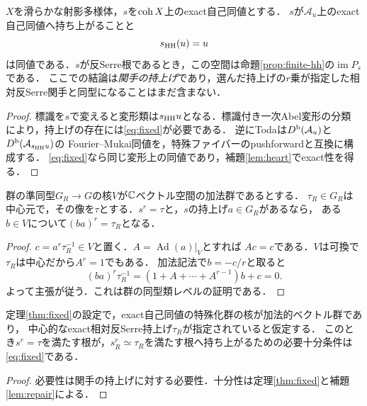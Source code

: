 \begin{theorem}[指定した関手の一次持上げ]\label{thm:fixed}
$X$を滑らかな射影多様体，$s$を$\operatorname{coh} X$上のexact自己同値とする．
$s$が$\mathcal A_u$上のexact自己同値へ持ち上がることと
\begin{equation}\label{eq:fixed}
 s_{\operatorname{HH}}(u)=u
\end{equation}
は同値である．$s$が反Serre根であるとき，この空間は命題\ref{prop:finite-hh}の$\operatorname{im}P_s$である．
ここでの結論は\emph{関手の持上げ}であり，選んだ持上げの$r$乗が指定した相対反Serre関手と同型になることはまだ含まない．
\end{theorem}
\begin{proof}
標識を$s$で変えると変形類は$s_{\operatorname{HH}}u$となる．標識付き一次Abel変形の分類
\cite[\S3]{LVdB}により，持上げの存在には\eqref{eq:fixed}が必要である．
逆にToda\cite[Theorem 1.1]{Toda}は$D^{\mathrm b}(\mathcal A_u)$と$D^{\mathrm b}(\mathcal A_{s_{\operatorname{HH}}u})$の
Fourier--Mukai同値を，特殊ファイバーのpushforwardと互換に構成する．
\eqref{eq:fixed}なら同じ変形上の同値であり，補題\ref{lem:heart}でexact性を得る．
\end{proof}

\begin{lemma}\label{lem:repair}
群の準同型$G_R\to G$の核$V$が$\mathbb C$ベクトル空間の加法群であるとする．
$\tau_R\in G_R$は中心元で，その像を$\tau$とする．$s^r=\tau$と，$s$の持上げ$a\in G_R$があるなら，
ある$b\in V$について$(ba)^r=\tau_R$となる．
\end{lemma}
\begin{proof}
$c=a^r\tau_R^{-1}\in V$と置く．$A=\operatorname{Ad}(a)|_V$とすれば
$Ac=c$である．$V$は可換で$\tau_R$は中心だから$A^r=1$でもある．
加法記法で$b=-c/r$と取ると
\[
 (ba)^r\tau_R^{-1}=(1+A+\cdots+A^{r-1})b+c=0.
\]
よって主張が従う．これは群の同型類レベルの証明である．
\end{proof}

\begin{corollary}[相対Serre仮定付きの根の持上げ]\label{cor:relative-root}
定理\ref{thm:fixed}の設定で，exact自己同値の特殊化群の核が加法的ベクトル群であり，
中心的なexact相対反Serre持上げ$\tau_R$が指定されていると仮定する．
このとき$s^r=\tau$を満たす根が，$s_R^r\simeq\tau_R$を満たす根へ持ち上がるための必要十分条件は\eqref{eq:fixed}である．
\end{corollary}
\begin{proof}
必要性は関手の持上げに対する必要性．十分性は定理\ref{thm:fixed}と補題\ref{lem:repair}による．
\end{proof}

